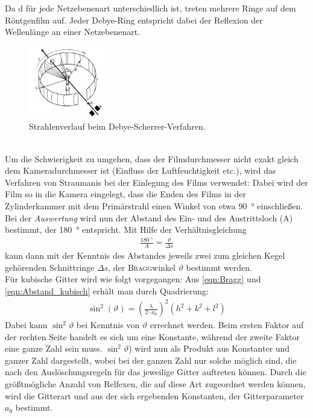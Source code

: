 \documentclass[a4paper,twoside,final]{article}
\begin{document}
Da d für jede Netzebenenart unterschiedlich ist, treten mehrere Ringe auf dem Röntgenfilm auf. Jeder Debye-Ring entspricht dabei der Reflexion der Wellenlänge an einer Netzebenenart.
\begin{figure}[htp]
    \centering
    \includegraphics[width=0.3\textwidth]{Abbildungen/Debye-Sherrer-Kamera.pdf}
    \caption{Strahlenverlauf beim Debye-Scherrer-Verfahren.~\cite[S.375]{Kleber}}
    \label{fig:Debye-Kamera}
\end{figure}\\
Um die Schwierigkeit zu umgehen, dass der Filmdurchmesser nicht exakt gleich dem Kameradurchmesser ist (Einfluss der Luftfeuchtigkeit etc.), wird das Verfahren von Straumanis bei der Einlegung des Films verwendet: Dabei wird der Film so in die Kamera eingelegt, dass die Enden des Films in der Zylinderkammer mit dem Primärstrahl einen Winkel von etwa \SI{90}{\degree} einschließen.\\
Bei der \textit{Auswertung} wird nun der Abstand des Ein- und des Austrittsloch (A) bestimmt, der \SI{180}{\degree} entspricht. Mit Hilfe der Verhältnisgleichung
\begin{align}
  \frac{\SI{180}{\degree}}{A} = \frac{\vartheta}{\Delta s}\label{eqn:Verhältnisgleichung}
\end{align}
kann dann mit der Kenntnis des Abstandes jeweils zwei zum gleichen Kegel gehörenden Schnittringe $\Delta s$, der \textsc{Bragg}winkel $\vartheta$ bestimmt werden. \\
Für kubische Gitter wird wie folgt vorgegangen: Aus \eqref{eqn:Bragg} und \eqref{eqn:Abstand_kubisch} erhält man durch Quadrierung:
\begin{align}\label{equ:Auswertung}
  \sin^2(\vartheta) = \left(\frac{\lambda}{2\cdot a_0}\right)^2 (h^2+k^2+l^2)
\end{align}
Dabei kann $\sin^2\vartheta$ bei Kenntnis von $\vartheta$ errechnet werden. Beim ersten Faktor auf der rechten Seite handelt es sich um eine Konstante, während der zweite Faktor eine ganze Zahl sein muss. $\sin^2\vartheta$) wird nun als Produkt aus Konstanter und ganzer Zahl dargestellt, wobei bei der ganzen Zahl nur solche möglich sind, die nach den Auslöschungsregeln für das jeweilige Gitter auftreten können. Durch die größtmögliche Anzahl von Relfexen, die auf diese Art zugeordnet werden können, wird die Gitterart und aus der sich ergebenden Konstanten, der Gitterparameter $a_0$ bestimmt.
\end{document}
